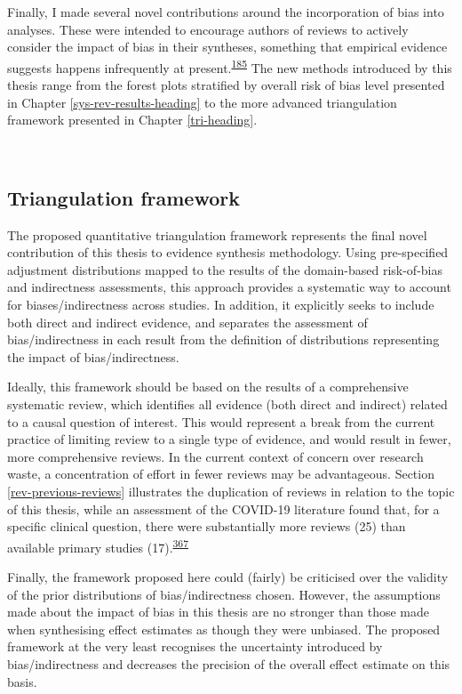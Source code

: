 \documentclass[a4paper, twoside]{templates/ociamthesis}
\begin{document}
Finally, I made several novel contributions around the incorporation of bias into analyses. These were intended to encourage authors of reviews to actively consider the impact of bias in their syntheses, something that empirical evidence suggests happens infrequently at present.\textsuperscript{\protect\hyperlink{ref-katikireddi2015}{185}} The new methods introduced by this thesis range from the forest plots stratified by overall risk of bias level presented in Chapter \ref{sys-rev-results-heading} to the more advanced triangulation framework presented in Chapter \ref{tri-heading}.

~

\hypertarget{triangulation-framework}{%
\subsection{Triangulation framework}\label{triangulation-framework}}

The proposed quantitative triangulation framework represents the final novel contribution of this thesis to evidence synthesis methodology. Using pre-specified adjustment distributions mapped to the results of the domain-based risk-of-bias and indirectness assessments, this approach provides a systematic way to account for biases/indirectness across studies. In addition, it explicitly seeks to include both direct and indirect evidence, and separates the assessment of bias/indirectness in each result from the definition of distributions representing the impact of bias/indirectness.

Ideally, this framework should be based on the results of a comprehensive systematic review, which identifies all evidence (both direct and indirect) related to a causal question of interest. This would represent a break from the current practice of limiting review to a single type of evidence, and would result in fewer, more comprehensive reviews. In the current context of concern over research waste, a concentration of effort in fewer reviews may be advantageous. Section \ref{rev-previous-reviews} illustrates the duplication of reviews in relation to the topic of this thesis, while an assessment of the COVID-19 literature found that, for a specific clinical question, there were substantially more reviews (25) than available primary studies (17).\textsuperscript{\protect\hyperlink{ref-perez-gaxiola2021}{367}}

Finally, the framework proposed here could (fairly) be criticised over the validity of the prior distributions of bias/indirectness chosen. However, the assumptions made about the impact of bias in this thesis are no stronger than those made when synthesising effect estimates as though they were unbiased. The proposed framework at the very least recognises the uncertainty introduced by bias/indirectness and decreases the precision of the overall effect estimate on this basis.
\end{document}
